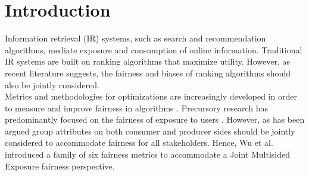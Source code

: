 \section{Introduction}


Information retrieval (IR) systems, such as search and recommendation algorithms, mediate exposure and consumption of online information. Traditional IR systems are built on ranking algorithms that maximize utility. However, as recent literature \cite{DBLP:Diaz} \cite{kay} \cite{Singh_2018} suggests, the fairness and biases of ranking algorithms should also be jointly considered. \\

Metrics and methodologies for optimizations are increasingly developed in order to measure and improve fairness in algorithms \cite{DBLP:journals/corr/Burke17aa} \cite{DBLP:journals/corr/abs-2105-05779} \cite{wu}. Precursory research has predominantly focused on the fairness of exposure to users \cite{DBLP:Diaz}. However, as has been argued \cite{DBLP:journals/corr/Burke17aa} \cite{DBLP:journals/corr/abs-2105-05779} group attributes on both consumer and producer sides should be jointly considered to accommodate fairness for all stakeholders. Hence, Wu et al.\cite{wu} introduced a family of six fairness metrics to accommodate a Joint Multisided Exposure fairness perspective. 



